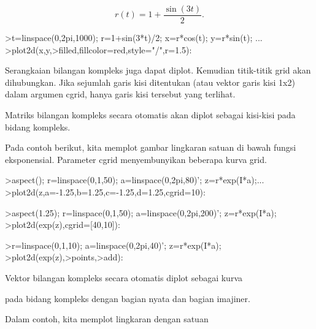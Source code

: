 \documentclass{article}
\begin{document}
\begin{eulernotebook}
\begin{eulercomment}
\begin{eulercomment}
\begin{eulercomment}
\begin{eulercomment}
\begin{eulercomment}
\begin{eulercomment}
\begin{eulercomment}
\end{eulercomment}
\begin{eulerformula}
\[
r(t) = 1 + \dfrac{\sin(3t)}{2}.
\]
\end{eulerformula}
\begin{eulerprompt}
>t=linspace(0,2pi,1000); r=1+sin(3*t)/2; x=r*cos(t); y=r*sin(t); ...
>plot2d(x,y,>filled,fillcolor=red,style="/",r=1.5):
\end{eulerprompt}
\begin{eulercomment}
Serangkaian  bilangan  kompleks  juga  dapat  diplot.  Kemudian
titik-titik  grid  akan  dihubungkan.  Jika  sejumlah  garis  kisi
ditentukan (atau vektor  garis  kisi  1x2)  dalam  argumen  cgrid,
hanya  garis  kisi  tersebut  yang  terlihat.

Matriks  bilangan  kompleks  secara  otomatis  akan  diplot  sebagai
kisi-kisi  pada  bidang  kompleks.

Pada  contoh  berikut,  kita  memplot  gambar  lingkaran  satuan di
bawah  fungsi  eksponensial.  Parameter  cgrid  menyembunyikan
beberapa kurva  grid.
\end{eulercomment}
\begin{eulerprompt}
>aspect(); r=linspace(0,1,50); a=linspace(0,2pi,80)'; z=r*exp(I*a);...
>plot2d(z,a=-1.25,b=1.25,c=-1.25,d=1.25,cgrid=10):
\end{eulerprompt}
\begin{eulerprompt}
>aspect(1.25); r=linspace(0,1,50); a=linspace(0,2pi,200)'; z=r*exp(I*a);
>plot2d(exp(z),cgrid=[40,10]):
\end{eulerprompt}
\begin{eulerprompt}
>r=linspace(0,1,10); a=linspace(0,2pi,40)'; z=r*exp(I*a);
>plot2d(exp(z),>points,>add):
\end{eulerprompt}
\begin{eulerttcomment}
 Vektor  bilangan  kompleks  secara  otomatis  diplot  sebagai  kurva
\end{eulerttcomment}
\begin{eulercomment}
pada  bidang  kompleks  dengan  bagian  nyata  dan  bagian  imajiner.

Dalam contoh, kita memplot lingkaran dengan satuan


\end{eulercomment}
\end{eulercomment}
\end{eulercomment}
\end{eulercomment}
\end{eulercomment}
\end{eulercomment}
\end{eulercomment}
\end{eulernotebook}
\end{document}
